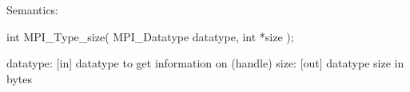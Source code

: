 Semantics:

int MPI_Type_size(
    MPI_Datatype datatype,
    int *size
    );

datatype: [in] datatype to get information on (handle)
size: [out] datatype size in bytes

